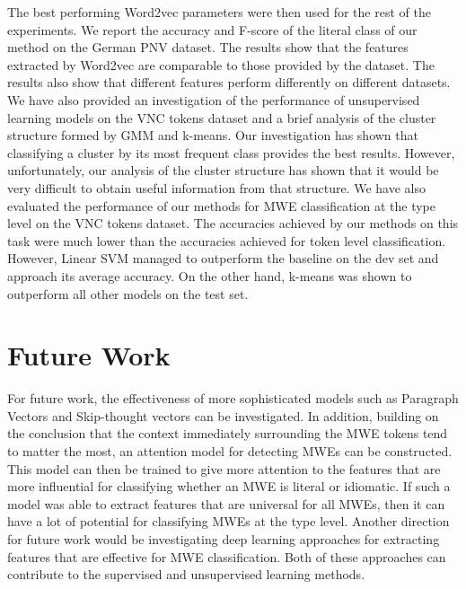 \documentclass[11pt]{article}
\begin{document}
The best performing Word2vec parameters were then used for the rest of the experiments. We report the accuracy and F-score of the literal class of our method on the German PNV dataset. The results show that the features extracted by Word2vec are comparable to those provided by the dataset. The results also show that different features perform differently on different datasets. We have also provided an investigation of the performance of unsupervised learning models on the VNC tokens dataset and a brief analysis of the cluster structure formed by GMM and k-means. Our investigation has shown that classifying a cluster by its most frequent class provides the best results. However, unfortunately, our analysis of the cluster structure has shown that it would be very difficult to obtain useful information from that structure. We have also evaluated the performance of our methods for MWE classification at the type level on the VNC tokens dataset. The accuracies achieved by our methods on this task were much lower than the accuracies achieved for token level classification. However, Linear SVM managed to outperform the baseline on the dev set and approach its average accuracy. On the other hand, k-means was shown to outperform all other models on the test set.

\section{Future Work}


For future work, the effectiveness of more sophisticated models such as Paragraph Vectors and Skip-thought vectors can be investigated. In addition, building on the conclusion that the context immediately surrounding the MWE tokens tend to matter the most, an attention model for detecting MWEs can be constructed. This model can then be trained to give more attention to the features that are more influential for classifying whether an MWE is literal or idiomatic. If such a model was able to extract features that are universal for all MWEs, then it can have a lot of potential for classifying MWEs at the type level. Another direction for future work would be investigating deep learning approaches for extracting features that are effective for MWE classification. Both of these approaches can contribute to the supervised and unsupervised learning methods. 
\end{document}
